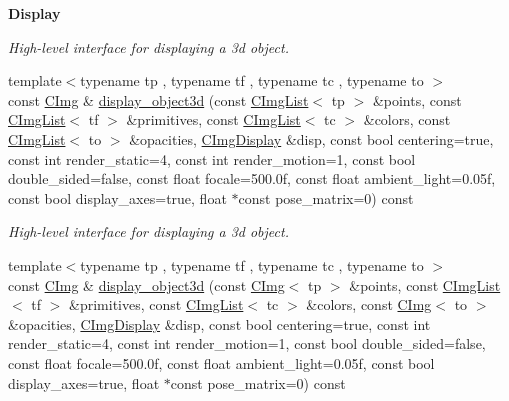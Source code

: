\begin{Indent}{\bf Display}
\begin{DoxyCompactItemize}
\begin{DoxyCompactList}\small\item\em High-\/level interface for displaying a 3d object. \end{DoxyCompactList}\item 
\hypertarget{structcimg__library_1_1_c_img_a08ace5215b345a7efd284a1de8f954e7}{{\footnotesize template$<$typename tp , typename tf , typename tc , typename to $>$ }\\const \hyperlink{structcimg__library_1_1_c_img}{C\-Img} \& \hyperlink{structcimg__library_1_1_c_img_a08ace5215b345a7efd284a1de8f954e7}{display\-\_\-object3d} (const \hyperlink{structcimg__library_1_1_c_img_list}{C\-Img\-List}$<$ tp $>$ \&points, const \hyperlink{structcimg__library_1_1_c_img_list}{C\-Img\-List}$<$ tf $>$ \&primitives, const \hyperlink{structcimg__library_1_1_c_img_list}{C\-Img\-List}$<$ tc $>$ \&colors, const \hyperlink{structcimg__library_1_1_c_img_list}{C\-Img\-List}$<$ to $>$ \&opacities, \hyperlink{structcimg__library_1_1_c_img_display}{C\-Img\-Display} \&disp, const bool centering=true, const int render\-\_\-static=4, const int render\-\_\-motion=1, const bool double\-\_\-sided=false, const float focale=500.\-0f, const float ambient\-\_\-light=0.\-05f, const bool display\-\_\-axes=true, float $\ast$const pose\-\_\-matrix=0) const }\label{structcimg__library_1_1_c_img_a08ace5215b345a7efd284a1de8f954e7}

\begin{DoxyCompactList}\small\item\em High-\/level interface for displaying a 3d object. \end{DoxyCompactList}\item 
\hypertarget{structcimg__library_1_1_c_img_aa3eed8e894915ccdac8d0914be4dc749}{{\footnotesize template$<$typename tp , typename tf , typename tc , typename to $>$ }\\const \hyperlink{structcimg__library_1_1_c_img}{C\-Img} \& \hyperlink{structcimg__library_1_1_c_img_aa3eed8e894915ccdac8d0914be4dc749}{display\-\_\-object3d} (const \hyperlink{structcimg__library_1_1_c_img}{C\-Img}$<$ tp $>$ \&points, const \hyperlink{structcimg__library_1_1_c_img_list}{C\-Img\-List}$<$ tf $>$ \&primitives, const \hyperlink{structcimg__library_1_1_c_img_list}{C\-Img\-List}$<$ tc $>$ \&colors, const \hyperlink{structcimg__library_1_1_c_img}{C\-Img}$<$ to $>$ \&opacities, \hyperlink{structcimg__library_1_1_c_img_display}{C\-Img\-Display} \&disp, const bool centering=true, const int render\-\_\-static=4, const int render\-\_\-motion=1, const bool double\-\_\-sided=false, const float focale=500.\-0f, const float ambient\-\_\-light=0.\-05f, const bool display\-\_\-axes=true, float $\ast$const pose\-\_\-matrix=0) const }\label{structcimg__library_1_1_c_img_aa3eed8e894915ccdac8d0914be4dc749}


\end{DoxyCompactItemize}
\end{Indent}
